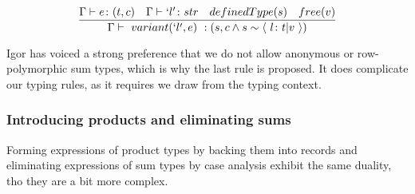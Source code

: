 \documentclass[11pt]{article}
\begin{document}
\begin{enumerate}
$$
\frac
{
\Gamma \vdash e \colon (t, c) \quad
\Gamma \vdash `l' \colon str \quad
definedType(s) \quad
free(v)
}
{
\Gamma \vdash \ variant(`l', e) \ :
(s, c \land s \sim \langle \ l \colon t | v \ \rangle)
}
$$


Igor has voiced a strong preference that we do not allow anonymous or
row-polymorphic sum types, which is why the last rule is proposed. It does
complicate our typing rules, as it requires we draw from the typing context.
\end{enumerate}


\subsubsection{Introducing products and eliminating sums}
\label{sec:org73a7e20}
Forming expressions of product types by backing them into records and
eliminating expressions of sum types by case analysis exhibit the same
duality, tho they are a bit more complex.
\end{document}
